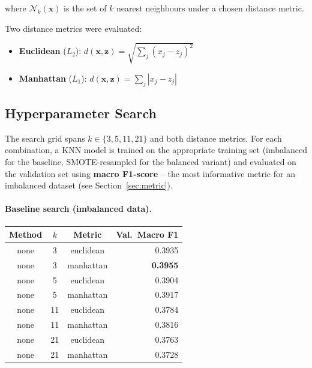 \documentclass[12pt,a4paper]{article}
\begin{document}
where $\mathcal{N}_k(\mathbf{x})$ is the set of $k$ nearest neighbours under a
chosen distance metric.

Two distance metrics were evaluated:

\begin{itemize}
  \item \textbf{Euclidean} ($L_2$):
    $d(\mathbf{x},\mathbf{z}) = \sqrt{\sum_j (x_j - z_j)^2}$
  \item \textbf{Manhattan} ($L_1$):
    $d(\mathbf{x},\mathbf{z}) = \sum_j |x_j - z_j|$
\end{itemize}

\subsection{Hyperparameter Search}

The search grid spans $k \in \{3, 5, 11, 21\}$ and both distance metrics.
For each combination, a KNN model is trained on the appropriate training set
(imbalanced for the baseline, SMOTE-resampled for the balanced variant) and
evaluated on the validation set using \textbf{macro F1-score} -- the most
informative metric for an imbalanced dataset (see Section~\ref{sec:metric}).

\paragraph{Baseline search (imbalanced data).}

\begin{center}
\begin{tabular}{cccr}
  \toprule
  \textbf{Method} & $k$ & \textbf{Metric} & \textbf{Val.\ Macro F1} \\
  \midrule
  none & 3  & euclidean & 0.3935 \\
  none & 3  & manhattan & \textbf{0.3955} \\
  none & 5  & euclidean & 0.3904 \\
  none & 5  & manhattan & 0.3917 \\
  none & 11 & euclidean & 0.3784 \\
  none & 11 & manhattan & 0.3816 \\
  none & 21 & euclidean & 0.3763 \\
  none & 21 & manhattan & 0.3728 \\
  \bottomrule
\end{tabular}
\end{center}
\end{document}
